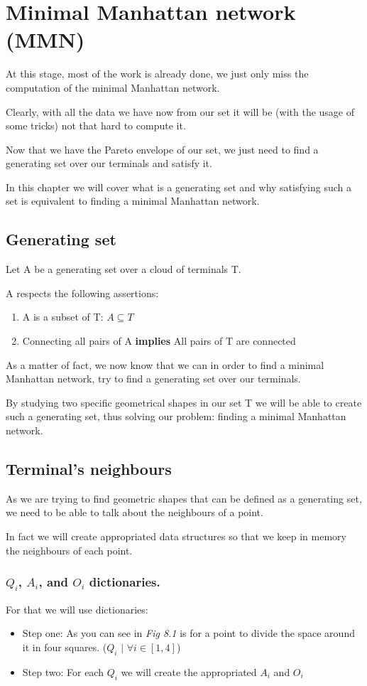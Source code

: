 \chapter{Minimal Manhattan network (MMN)}
At this stage, most of the work is already done, we just only miss the computation of the minimal Manhattan network.

Clearly, with all the data we have now from our set it will be (with the usage of some tricks) not that hard to compute it.

Now that we have the Pareto envelope of our set, we just need to find a generating set over our terminals and satisfy it.

In this chapter we will cover what is a generating set and why satisfying such a set is equivalent to finding a minimal Manhattan network.
\section{Generating set}%
\noindent Let A be a generating set over a cloud of terminals T.

\noindent A respects the following assertions:
\begin{enumerate}
	\item{A is a subset of T: $A \subseteq T$ }
	\item{Connecting all pairs of A \textbf{implies} All pairs of T are connected }
\end{enumerate}

\noindent As a matter of fact, we now know that we can in order to find a minimal Manhattan network, try to find a generating set over our terminals.

By studying two specific geometrical shapes in our set T we will be able to create such a generating set, thus solving our problem: finding a minimal Manhattan network.
\section{Terminal's neighbours}%
As we are trying to find geometric shapes that can be defined as a generating set, we need to be able to talk about the neighbours of a point.

In fact we will create appropriated data structures so that we keep in memory the neighbours of each point.

\subsection{$Q_i$, $A_i$, and $O_i$ dictionaries.}
\noindent For that we will use dictionaries:
\begin{itemize}[noitemsep, nolistsep]
	\item{Step one: As you can see in \emph{Fig 8.1} is for a point to divide the space around it in four squares. ($Q_i$ $|$ $\forall i \in [1,4]$) }
	\item{Step two: For each $Q_i$ we will create the appropriated $A_i$ and $O_i$}
\end{itemize}

